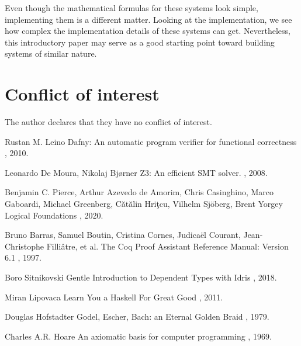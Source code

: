 \documentclass{article}
\begin{document}
Even though the mathematical formulas for these systems look simple, implementing them is a different matter. Looking at the implementation, we see how complex the implementation details of these systems can get. Nevertheless, this introductory paper may serve as a good starting point toward building systems of similar nature.

\section{Conflict of interest}

The author declares that they have no conflict of interest.

\begin{thebibliography}{1}

Rustan M. Leino
\newblock Dafny: An automatic program verifier for functional correctness
, 2010.

Leonardo De Moura, Nikolaj Bjørner
\newblock Z3: An efficient SMT solver.
, 2008.

Benjamin C. Pierce, Arthur Azevedo de Amorim, Chris Casinghino, Marco Gaboardi, Michael Greenberg, Cătălin Hriţcu, Vilhelm Sjöberg, Brent Yorgey
\newblock Logical Foundations
, 2020.

Bruno Barras, Samuel Boutin, Cristina Cornes, Judicaël Courant, Jean-Christophe Filliâtre, et al.
\newblock The Coq Proof Assistant Reference Manual: Version 6.1
, 1997.

Boro Sitnikovski
\newblock Gentle Introduction to Dependent Types with Idris
, 2018.

Miran Lipovaca
\newblock Learn You a Haskell For Great Good
, 2011.

Douglas Hofstadter
\newblock Godel, Escher, Bach: an Eternal Golden Braid
, 1979.

Charles A.R. Hoare
\newblock An axiomatic basis for computer programming
, 1969.

\end{thebibliography}
\end{document}
